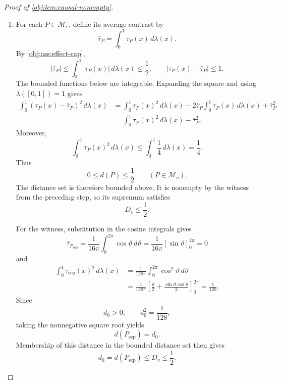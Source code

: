 \begin{proof}[Proof of \cref{obj:lem:causal-nonempty}]
\begin{enumerate}
For the moment restriction, the baseline and effect caps imply
\[
|m_{0,\mathrm{sep}}(x)|\le1,
\qquad
|m_{0,\mathrm{sep}}(x)+\tau_{\mathrm{sep}}(x)|
\le |m_{0,\mathrm{sep}}(x)|+|\tau_{\mathrm{sep}}(x)|
\le1.
\]
Since \(p>0\), both deterministic arm kernels therefore satisfy
\[
\int |y|^p\,Q_{a_{\mathrm{arm}},P_{\mathrm{sep}}}(dy\mid x)
\le1\le10
\qquad
\bigl(a_{\mathrm{arm}}\in\{0,1\},\ x\in[0,1]\bigr).
\]
This verifies every restriction in \cref{obj:def:model}, and hence
\[
P_{\mathrm{sep}}\in\mathcal M_v.
\]

\item\label{proof:causal-nonempty:distance-bounds} For each \(P\in\mathcal M_v\), define its average contrast by
\[
\bar\tau_P=\int_0^1\tau_P(x)\,d\lambda(x).
\]
By \cref{obj:ass:effect-cap},
\[
|\bar\tau_P|
\le\int_0^1|\tau_P(x)|\,d\lambda(x)
\le\frac12,
\qquad
|\tau_P(x)-\bar\tau_P|\le1.
\]
The bounded functions below are integrable. Expanding the square and using
\(\lambda([0,1])=1\) gives
\[
\begin{aligned}
\int_0^1(\tau_P(x)-\bar\tau_P)^2\,d\lambda(x)
&=\int_0^1\tau_P(x)^2\,d\lambda(x)
 -2\bar\tau_P\int_0^1\tau_P(x)\,d\lambda(x)
 +\bar\tau_P^2\\
&=\int_0^1\tau_P(x)^2\,d\lambda(x)-\bar\tau_P^2.
\end{aligned}
\]
Moreover,
\[
\int_0^1\tau_P(x)^2\,d\lambda(x)
\le\int_0^1\frac14\,d\lambda(x)=\frac14.
\]
Thus
\[
0\le d(P)\le\frac12
\qquad(P\in\mathcal M_v).
\]
The distance set is therefore bounded above. It is nonempty by the witness from the preceding step, so its supremum satisfies
\[
D_v\le\frac12.
\]

For the witness, substitution in the cosine integrals gives
\[
\bar\tau_{P_{\mathrm{sep}}}
=\frac{1}{16\pi}\int_0^{2\pi}\cos\vartheta\,d\vartheta
=\frac{1}{16\pi}[\sin\vartheta]_0^{2\pi}
=0
\]
and
\[
\begin{aligned}
\int_0^1\tau_{\mathrm{sep}}(x)^2\,d\lambda(x)
&=\frac{1}{128\pi}
  \int_0^{2\pi}\cos^2\vartheta\,d\vartheta\\
&=\frac{1}{128\pi}
 \left[\frac{\vartheta}{2}
       +\frac{\sin\vartheta\cos\vartheta}{2}\right]_0^{2\pi}
=\frac1{128}.
\end{aligned}
\]
Since
\[
d_0>0,\qquad d_0^2=\frac1{128},
\]
taking the nonnegative square root yields
\[
d(P_{\mathrm{sep}})=d_0.
\]
Membership of this distance in the bounded distance set then gives
\[
d_0=d(P_{\mathrm{sep}})\le D_v\le\frac12.
\]


\end{enumerate}
\end{proof}
